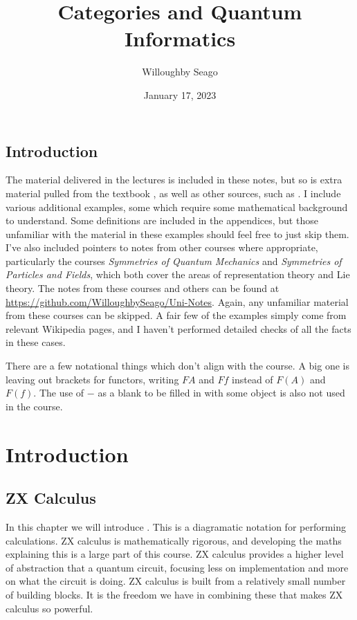 \documentclass[fleqn]{NotesClass}
\title{Categories and Quantum Informatics}
\author{Willoughby Seago}
\date{January 17, 2023}
\newcommand*{\course}[1]{\textit{#1}}
\begin{document}
    \frontmatter
    \titlepage
    \innertitlepage{}
    \tableofcontents
    \listoffigures
    \mainmatter
    
    \chapter{Introduction}
    The material delivered in the lectures is included in these notes, but so is extra material pulled from the textbook \cite{heunen}, as well as other sources, such as \cite{leinster}.
    I include various additional examples, some which require some mathematical background to understand.
    Some definitions are included in the appendices, but those unfamiliar with the material in these examples should feel free to just skip them.
    I've also included pointers to notes from other courses where appropriate, particularly the courses \course{Symmetries of Quantum Mechanics} and \course{Symmetries of Particles and Fields}, which both cover the areas of representation theory and Lie theory.
    The notes from these courses and others can be found at \url{https://github.com/WilloughbySeago/Uni-Notes}.
    Again, any unfamiliar material from these courses can be skipped.
    A fair few of the examples simply come from relevant Wikipedia pages, and I haven't performed detailed checks of all the facts in these cases.
    
    There are a few notational things which don't align with the course.
    A big one is leaving out brackets for functors, writing \(FA\) and \(Ff\) instead of \(F(A)\) and \(F(f)\).
    The use of \(-\) as a blank to be filled in with some object is also not used in the course.
    
    \part{Introduction}
    
    \chapter{ZX Calculus}
    In this chapter we will introduce .
    This is a diagramatic notation for performing calculations.
    ZX calculus is mathematically rigorous, and developing the maths explaining this is a large part of this course.
    ZX calculus provides a higher level of abstraction that a quantum circuit, focusing less on implementation and more on what the circuit is doing.
    ZX calculus is built from a relatively small number of building blocks.
    It is the freedom we have in combining these that makes ZX calculus so powerful.
    
\end{document}
